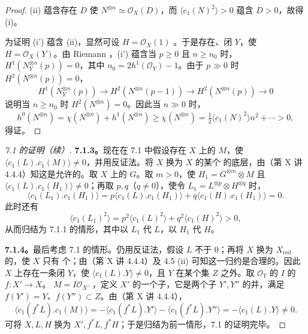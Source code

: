 \begin{proof}
(ii) 蕴含存在 $D$ 使 $N^{\otimes n}\simeq\mathscr O_X(D)$，而 $\langle c_1(N)^2\rangle>0$ 蕴含 $D>0$，故得 (i)。

为证明 (i') 蕴含 (ii)，显然可设 $H=\mathscr O_X(1)$ 。于是存在、闭 $Y$，使 $H=\mathscr O_X(Y)$。由 Riemann ，(i') 蕴含当 $p\geq0$ 且 $n\geq n_0$ 时，$H^1(N_Y^{\otimes n}(p))=0$，其中 $n_0=2h^1(\mathscr O_Y)-1$。由于 $p\gg0$ 时 $H^2(N^{\otimes n}(p))=0$，
\[H^1(N_Y^{\otimes n}(p))\longrightarrow H^2(N^{\otimes n}(p-1))\longrightarrow H^2(N^{\otimes n}(p))\longrightarrow0\]
说明当 $n\geq n_0$ 时 $H^2(N^{\otimes n})=0$。因此当 $n\gg0$ 时，
\[h^0(N^{\otimes n})=\chi(N^{\otimes n})+h^1(N^{\otimes n})
\geq\chi(N^{\otimes n})=\tfrac12\langle c_1(N)^2\rangle n^2+\cdots>0,\]
得证。
\end{proof}
\begin{proof}[ 7.1 的证明（续）]
\textbf{7.1.3。}现在在 7.1 中假设存在 $X$ 上的 $M$，使 $\langle c_1(L).c_1(M)\rangle\neq0$，并用反证法。将 $X$ 换为 $X$ 的某个 的底层，由（第 X 讲 4.4.4）知这是允许的。取 $X$ 上的 $G$。取 $m>0$，使 $H_1=G^{\otimes m}\otimes M$ 且 $\langle c_1(L).c_1(H_1)\rangle\neq0$；再取 $p,q$（$q\neq0$），使令 $L_1=L^{\otimes p}\otimes H^{\otimes q}$ 时，
\[\langle c_1(L_1).c_1(H_1)\rangle
=p\langle c_1(L).c_1(H_1)\rangle+q\langle c_1(H).c_1(H_1)\rangle=0.\]
此时还有
\[\langle c_1(L_1)^2\rangle=p^2\langle c_1(L)^2\rangle+q^2\langle c_1(H)^2\rangle>0,\]
从而归结为 7.1.1 的情形，其中以 $L_1$ 代 $L$，以 $H_1$ 代 $H$。

\textbf{7.1.4。}最后考虑 7.1 的情形。仍用反证法，假设 $L$ 不于 $0$；再将 $X$ 换为 $X_{\mathrm{red}}$ 的，使 $X$ 只有
个；由（第 X 讲 4.4.4）及 4.5 (ii) 可知这一归约是合理的。因此 $X$ 上存在一条闭 $Y$，使 $\langle c_1(L).Y\rangle\neq0$，且 $Y$ 在某个集 $Z$ 之外。取 $\mathscr O_Y$ 的 $I$ 的 $f:X'\to X$。 $M=I\mathscr O_{X'}$ ，定义 $X'$ 的一个子，它是两个子 $Y',Y''$ 的并，满足 $f(Y')=Y$、$f(Y'')\subset Z$。由（第 X 讲 4.4.4），
\[\langle c_1(f^*L).c_1(M)\rangle
=-\langle c_1(f^*L).Y'\rangle-\langle c_1(f^*L).Y''\rangle
=-\langle c_1(L).Y\rangle\neq0.\]
可将 $X,L,H$ 换为 $X',f^*L,f^*H$；于是归结为前一情形，7.1 的证明完毕。
\end{proof}
